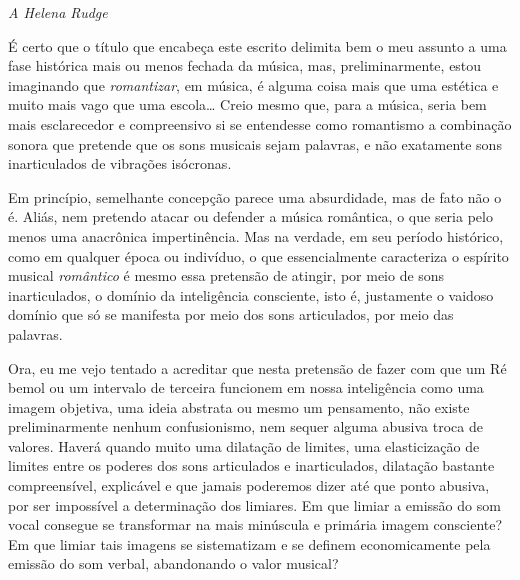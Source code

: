 
\begin{flushright}
\emph{A Helena Rudge}
\end{flushright}

\noindent{}É certo que o título que encabeça este escrito delimita bem o meu
assunto a uma fase histórica mais ou menos fechada da música, mas,
preliminarmente, estou imaginando que \textit{romantizar}, em música, é
alguma coisa mais que uma estética e muito mais vago que uma escola\ldots{}
Creio mesmo que, para a música, seria bem mais esclarecedor e
compreensivo si se entendesse como romantismo a combinação sonora que
pretende que os sons musicais sejam palavras, e não exatamente sons
inarticulados de vibrações isócronas.

Em princípio, semelhante concepção parece uma absurdidade, mas de fato
não o é. Aliás, nem pretendo atacar ou defender a música romântica, o
que seria pelo menos uma anacrônica impertinência. Mas na verdade, em
seu período histórico, como em qualquer época ou indivíduo, o que
essencialmente caracteriza o espírito musical \textit{romântico} é mesmo essa
pretensão de atingir, por meio de sons inarticulados, o domínio da
inteligência consciente, isto é, justamente o vaidoso domínio que só se
manifesta por meio dos sons articulados, por meio das palavras.

Ora, eu me vejo tentado a acreditar que nesta pretensão de fazer com que
um Ré bemol ou um intervalo de terceira funcionem em nossa inteligência
como uma imagem objetiva, uma ideia abstrata ou mesmo um pensamento, não
existe preliminarmente nenhum confusionismo, nem sequer alguma abusiva
troca de valores. Haverá quando muito uma dilatação de limites, uma
elasticização de limites entre os poderes dos sons articulados e
inarticulados, dilatação bastante compreensível, explicável e que jamais
poderemos dizer até que ponto abusiva, por ser impossível a determinação
dos limiares. Em que limiar a emissão do som vocal consegue se
transformar na mais minúscula e primária imagem consciente? Em que
limiar tais imagens se sistematizam e se definem economicamente pela
emissão do som verbal, abandonando o valor musical?

